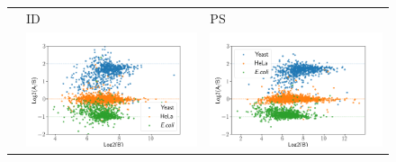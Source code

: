 \documentclass[11pt]{article}
\begin{document}
\begin{figure}[hbt]
    \centering
    \setlength{\tabcolsep}{0pt}
    \begin{tabular}{   >{\centering\arraybackslash} m{3cm} V V}
                & ID & PS \\
        {} & \includegraphics[width=\linewidth]{../../result/report_plots_pipeline/scatter_ID_triqler.png}  
                & \includegraphics[width=\linewidth]{../../result/report_plots_pipeline/scatter_PS_triqler.png} \\ 

\end{tabular}
\end{figure}
\end{document}

